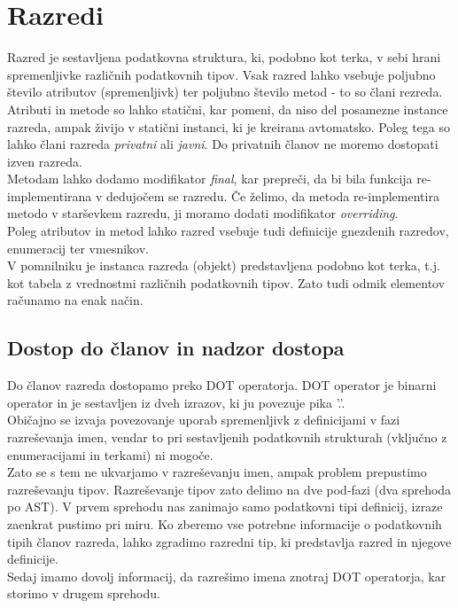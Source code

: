 \documentclass[a4paper, 12p]{book}
\begin{document}
\section{Razredi}

Razred je sestavljena podatkovna struktura, ki, podobno kot terka, v sebi hrani spremenljivke različnih podatkovnih tipov. Vsak razred lahko vsebuje poljubno število atributov (spremenljivk) ter poljubno število metod - to so člani rezreda. \\
\indent Atributi in metode so lahko statični, kar pomeni, da niso del posamezne instance razreda, ampak živijo v statični instanci, ki je kreirana avtomatsko. Poleg tega so lahko člani razreda \textit{privatni} ali \textit{javni}. Do privatnih članov ne moremo dostopati izven razreda. \\
\indent Metodam lahko dodamo modifikator \textit{final}, kar prepreči, da bi bila funkcija re-implementirana v dedujočem se razredu. Če želimo, da metoda re-implementira metodo v starševkem razredu, ji moramo dodati modifikator \textit{overriding}. \\
\indent Poleg atributov in metod lahko razred vsebuje tudi definicije gnezdenih razredov, enumeracij ter vmesnikov.\\
\indent V pomnilniku je instanca razreda (objekt) predstavljena podobno kot terka, t.j. kot tabela z vrednostmi različnih podatkovnih tipov. Zato tudi odmik elementov računamo na enak način.

\subsection{Dostop do članov in nadzor dostopa}

Do članov razreda dostopamo preko DOT operatorja. DOT operator je binarni operator in je sestavljen iz dveh izrazov, ki ju povezuje pika '.'. \\
\indent Običajno se izvaja povezovanje uporab spremenljivk z definicijami v fazi razreševanja imen, vendar to pri sestavljenih podatkovnih strukturah (vključno z enumeracijami in terkami) ni mogoče.\\
\indent Zato se s tem ne ukvarjamo v razreševanju imen, ampak problem prepustimo razreševanju tipov. Razreševanje tipov zato delimo na dve pod-fazi (dva sprehoda po AST). V prvem sprehodu nas zanimajo samo podatkovni tipi definicij, izraze zaenkrat pustimo pri miru. Ko zberemo vse potrebne informacije o podatkovnih tipih članov razreda, lahko zgradimo razredni tip, ki predstavlja razred in njegove definicije. \\
\indent Sedaj imamo dovolj informacij, da razrešimo imena znotraj DOT operatorja, kar storimo v drugem sprehodu.\\
\end{document}
